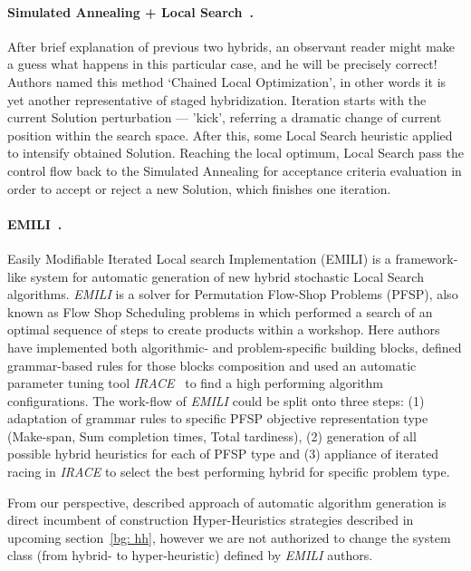 \paragraph{Simulated Annealing + Local Search~\cite{martin1996combining}.}
After brief explanation of previous two hybrids, an observant reader might make a guess what happens in this particular case, and he will be precisely correct!
Authors named this method `Chained Local Optimization', in other words it is yet another representative of staged hybridization. 
Iteration starts with the current Solution perturbation — 'kick', referring a dramatic change of current position within the search space. After this, some Local Search heuristic applied to intensify obtained Solution. Reaching the local optimum, Local Search pass the control flow back to the Simulated Annealing for acceptance criteria evaluation in order to accept or reject a new Solution, which finishes one iteration.

\paragraph{EMILI~\cite{pagnozzi2019automatic}.}
Easily Modifiable Iterated Local search Implementation (EMILI) is a framework-like system for automatic generation of new hybrid stochastic Local Search algorithms. \textit{EMILI} is a solver for Permutation Flow-Shop Problems (PFSP), also known as Flow Shop Scheduling problems in which performed a search of an optimal sequence of steps to create products within a workshop.
Here authors have implemented both algorithmic- and problem-specific building blocks, defined grammar-based rules for those blocks composition and used an automatic parameter tuning tool \textit{IRACE}~\cite{lopez2016irace} to find a high performing algorithm configurations. The work-flow of \textit{EMILI} could be split onto three steps: (1) adaptation of grammar rules to specific PFSP objective representation type (Make-span, Sum completion times, Total tardiness), (2) generation of all possible hybrid heuristics for each of PFSP type and (3) appliance of iterated racing in \textit{IRACE} to select the best performing hybrid for specific problem type. 

From our perspective, described approach of automatic algorithm generation is direct incumbent of construction Hyper-Heuristics strategies described in upcoming section~\ref{bg: hh}, however we are not authorized to change the system class (from hybrid- to hyper-heuristic) defined by \textit{EMILI} authors.


